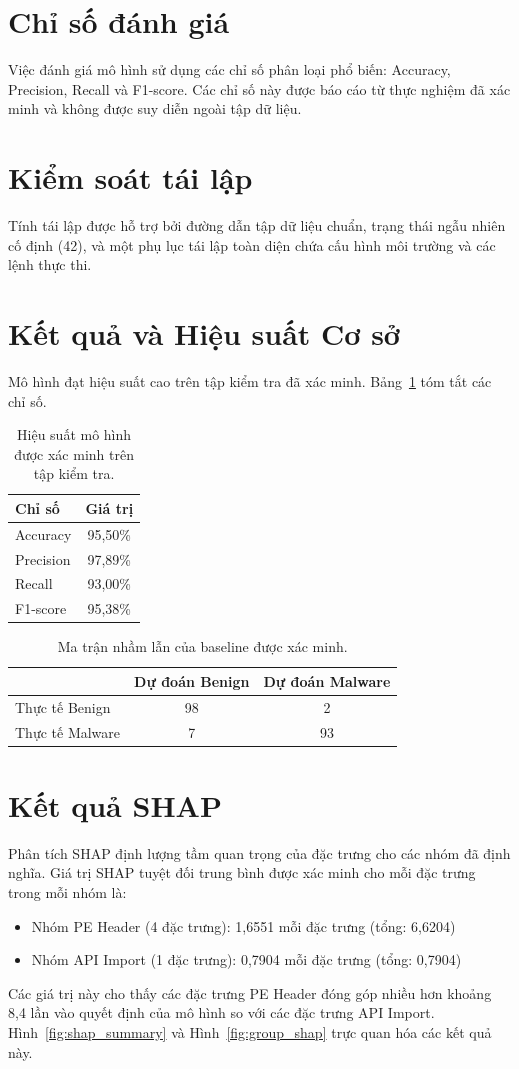\documentclass[conference]{IEEEtran}
\begin{document}
\section{Chỉ số đánh giá}
Việc đánh giá mô hình sử dụng các chỉ số phân loại phổ biến: Accuracy, Precision, Recall và F1-score. Các chỉ số này được báo cáo từ thực nghiệm đã xác minh và không được suy diễn ngoài tập dữ liệu.

\section{Kiểm soát tái lập}
Tính tái lập được hỗ trợ bởi đường dẫn tập dữ liệu chuẩn, trạng thái ngẫu nhiên cố định (42), và một phụ lục tái lập toàn diện chứa cấu hình môi trường và các lệnh thực thi.

\section{Kết quả và Hiệu suất Cơ sở}
Mô hình đạt hiệu suất cao trên tập kiểm tra đã xác minh. Bảng~\ref{tab:performance} tóm tắt các chỉ số.

\begin{table}[!t]
\centering
\caption{Hiệu suất mô hình được xác minh trên tập kiểm tra.}
\begin{tabular}{lc}
\toprule
Chỉ số & Giá trị \\
\midrule
Accuracy & 95,50\% \\
Precision & 97,89\% \\
Recall & 93,00\% \\
F1-score & 95,38\% \\
\bottomrule
\end{tabular}
\label{tab:performance}
\end{table}

\begin{table}[!t]
\centering
\caption{Ma trận nhầm lẫn của baseline được xác minh.}
\begin{tabular}{lcc}
\toprule
 & Dự đoán Benign & Dự đoán Malware \\
\midrule
Thực tế Benign & 98 & 2 \\
Thực tế Malware & 7 & 93 \\
\bottomrule
\end{tabular}
\label{tab:confusion}
\end{table}
\section{Kết quả SHAP}
Phân tích SHAP định lượng tầm quan trọng của đặc trưng cho các nhóm đã định nghĩa. Giá trị SHAP tuyệt đối trung bình được xác minh cho mỗi đặc trưng trong mỗi nhóm là:
\begin{itemize}
    \item Nhóm PE Header (4 đặc trưng): 1,6551 mỗi đặc trưng (tổng: 6,6204)
    \item Nhóm API Import (1 đặc trưng): 0,7904 mỗi đặc trưng (tổng: 0,7904)
\end{itemize}
Các giá trị này cho thấy các đặc trưng PE Header đóng góp nhiều hơn khoảng 8,4 lần vào quyết định của mô hình so với các đặc trưng API Import. Hình~\ref{fig:shap_summary} và Hình~\ref{fig:group_shap} trực quan hóa các kết quả này.
\end{document}
